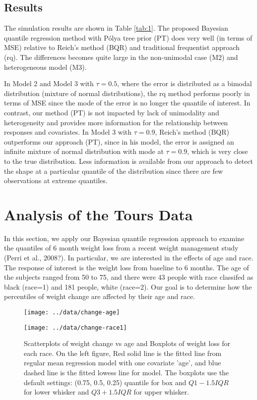 \documentclass[12pt]{article}
\newcommand{\polya}{P\'{o}lya}
\begin{document}
\subsection{Results}
The simulation results are shown in Table \ref{tab:1}. The proposed
Bayesian quantile regression method with \polya{} tree prior (PT)
does very well (in terms of MSE) relative to Reich's method (BQR)
and traditional frequentist approach 
(rq).
The differences becomes quite large in
the  non-unimodal case (M2) and heterogeneous model (M3). 

In Model 2 and Model 3 with $\tau=0.5$, where the error is
distributed as a bimodal distribution (mixture of normal
distributions), the rq method performs poorly in terms of MSE
since the mode of the error is no longer the quantile of
interest. In contrast, our method (PT) is not impacted by lack of
unimodality and heterogeneity and provides more information
for the relationship between responses and covariates. In Model 3
with $\tau=0.9$, Reich's method (BQR) outperforms our approach (PT),
since in his model, the error is assigned an infinite mixture of
normal distribution with mode at $\tau=0.9$, which is very close to
the true distribution. Less information is available from our
approach to detect the shape at a particular quantile of the
distribution since there are few observations at extreme quantiles. 

\section{Analysis of the Tours Data}
In this section, we apply our Bayesian quantile
regression approach to examine the quantiles of 6 month weight loss from a recent
weight management study (Perri et al., 2008?).  In particular, we are
interested in the effects of age and race.  
The response of interest is the  weight loss
from  baseline to  6 months. The age of
the subjects ranged from 50 to 75, and there were 43 people with race
classifed as 
black (race=1) and 181 people, white (race=2).
Our goal is to determine how  the percentiles of weight change
are affected by their age and race.

\begin{figure}[h]
  \begin{minipage}{0.5\linewidth}
    \centerline{\texttt{[image: ../data/change-age]}}
  \end{minipage}
  \begin{minipage}{0.5\linewidth}
    \centerline{\texttt{[image: ../data/change-race1]}}
  \end{minipage}

  \caption[]{\label{fig:tours} Scatterplots of weight change vs age and
    Boxplots of weight loss for each race. On the left figure, Red
    solid line is the   fitted line from regular mean regression model
    with one covariate   'age', and blue dashed line is the fitted
    lowess line for model.  The 
    boxplots use the default settings: (0.75, 0.5, 0.25) quantile for
    box and $Q1-1.5IQR$ for lower whisker and $Q3+1.5IQR$ for upper
    whisker. }
\end{figure}
\end{document}
